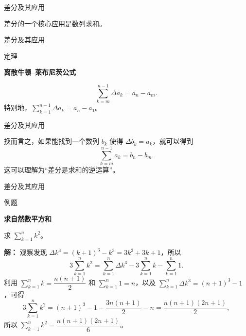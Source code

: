 \documentclass[aspectratio=169,10pt,fontset=fandol]{ctexbeamer}
\begin{document}
\begin{frame}[t,fragile]{差分及其应用}
\footnotesize
{\footnotesize
差分的一个核心应用是数列求和。


}
\end{frame}
\begin{frame}[t,fragile]{差分及其应用}
\footnotesize
\begin{block}{定理}
{\footnotesize
\textbf{离散牛顿--莱布尼茨公式}\par

\[
\sum _{k=m}^{n-1} \Delta a_k = a_n - a_m.
\]
特别地，\(\sum_{k=1}^{n-1} \Delta a_k = a_n - a_1\)。

}
\end{block}
\end{frame}
\begin{frame}[t,fragile]{差分及其应用}
\footnotesize
{\footnotesize
换而言之，如果能找到一个数列 \(b_k\) 使得 \(\Delta b_k=a_k\)，就可以得到
\[
\sum_{k=m}^{n-1}a_k=b_n-b_m.
\]
这可以理解为“差分是求和的逆运算”。


}
\end{frame}
\begin{frame}[t,fragile]{差分及其应用}
\footnotesize
\begin{block}{例题}
{\footnotesize
\textbf{求自然数平方和}\par

求 \(\sum_{k=1}^n k^2\)。

}
\end{block}
\pause
{\footnotesize
\textbf{解：}
观察发现 \(\Delta k^3 = (k+1)^3 - k^3 = 3k^2 + 3k + 1\)，所以
\[
3\sum_{k=1}^n k^2 = \sum_{k=1}^n \Delta k^3 - 3\sum_{k=1}^n k - \sum_{k=1}^n 1.
\]
利用 \(\sum_{k=1}^n  k = \dfrac{n(n+1)}{2}\) 和 \(\sum_{k=1}^n  1 = n\)，以及 \(\sum_{k=1}^n  \Delta k^3 = (n+1)^3 - 1\)，可得
\[
3\sum_{k=1}^n  k^2 = (n+1)^3 - 1 - \dfrac{3n(n+1)}{2} - n = \dfrac{n(n+1)(2n+1)}{2},
\]
所以 \(\sum_{k=1}^n k^2 = \dfrac{n(n+1)(2n+1)}{6}\)。

}
\end{frame}
\end{document}
